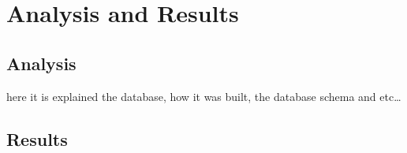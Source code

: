 

\chapter{Analysis and Results} \label{chap4:analysis_results}
\section{Analysis} \label{sec4:analysis}
here it is explained the database, how it was built, the database schema and etc\ldots

\section{Results} \label{sec4:results}
